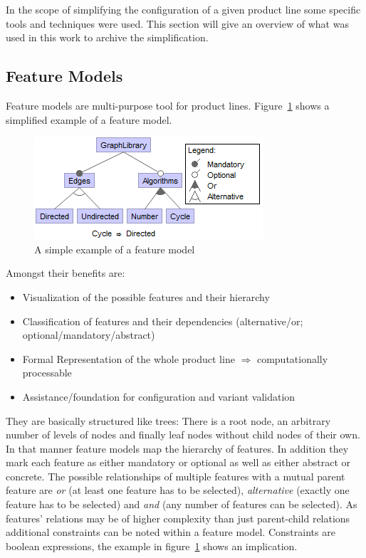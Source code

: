 In the scope of simplifying the configuration of a given product line some specific tools and techniques were used. This section will give an overview of what was used in this work to archive the simplification.

\subsection{Feature Models}
Feature models are multi-purpose tool for product lines. Figure~\ref{img-fm} shows a simplified example of a feature model.
\begin{figure}
	\includegraphics{img/img-fm.png}
	\caption{A simple example of a feature model}
	\label{img-fm}
\end{figure}
Amongst their benefits are:
\begin{itemize}
\item Visualization of the possible features and their hierarchy
\item Classification of features and their dependencies (alternative/or; optional/mandatory/abstract)
\item Formal Representation of the whole product line $\Rightarrow$ computationally processable
\item Assistance/foundation for configuration and variant validation
\end{itemize}
They are basically structured like trees: There is a root node, an arbitrary number of levels of nodes and finally leaf nodes without child nodes of their own. In that manner feature models map the hierarchy of features. In addition they mark each feature as either mandatory or optional as well as either abstract or concrete. The possible relationships of multiple features with a mutual parent feature are \textit{or} (at least one feature has to be selected), \textit{alternative} (exactly one feature has to be selected) and \textit{and} (any number of features can be selected). As features' relations may be of higher complexity than just parent-child relations additional constraints can be noted within a feature model. Constraints are boolean expressions, the example in figure~\ref{img-fm} shows an implication.

